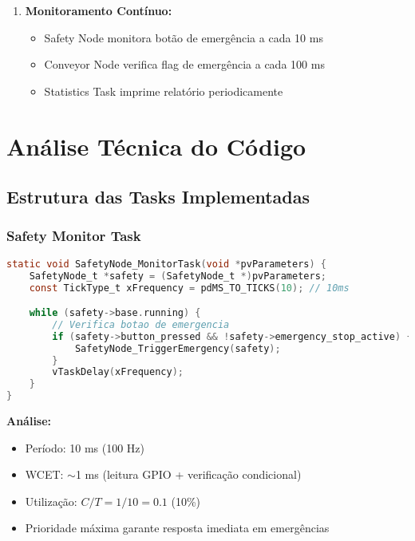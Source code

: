 \documentclass[12pt,a4paper]{article}
\begin{document}
\begin{enumerate}
    \item \textbf{Monitoramento Contínuo:}
    \begin{itemize}
        \item Safety Node monitora botão de emergência a cada 10 ms
        \item Conveyor Node verifica flag de emergência a cada 100 ms
        \item Statistics Task imprime relatório periodicamente
    \end{itemize}
\end{enumerate}

\section{Análise Técnica do Código}

\subsection{Estrutura das Tasks Implementadas}

\subsubsection{Safety Monitor Task}

\begin{lstlisting}[language=C, caption={SafetyNode\_MonitorTask - Prioridade 5}]
static void SafetyNode_MonitorTask(void *pvParameters) {
    SafetyNode_t *safety = (SafetyNode_t *)pvParameters;
    const TickType_t xFrequency = pdMS_TO_TICKS(10); // 10ms

    while (safety->base.running) {
        // Verifica botao de emergencia
        if (safety->button_pressed && !safety->emergency_stop_active) {
            SafetyNode_TriggerEmergency(safety);
        }
        vTaskDelay(xFrequency);
    }
}
\end{lstlisting}

\textbf{Análise:}
\begin{itemize}
    \item Período: 10 ms (100 Hz)
    \item WCET: $\sim$1 ms (leitura GPIO + verificação condicional)
    \item Utilização: $C/T = 1/10 = 0.1$ (10\%)
    \item Prioridade máxima garante resposta imediata em emergências
\end{itemize}
\end{document}
